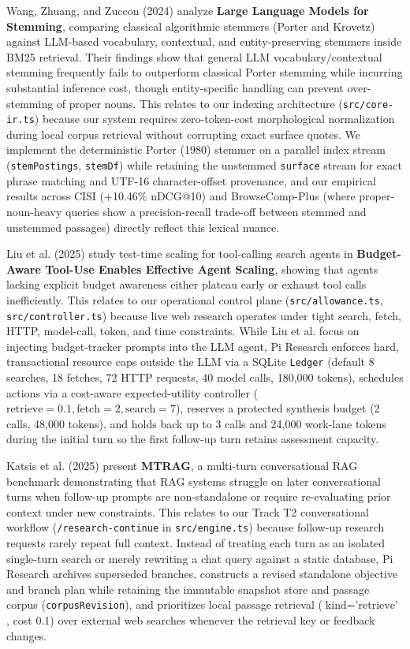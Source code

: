 \documentclass[conference]{IEEEtran}
\begin{document}
Wang, Zhuang, and Zuccon (2024) analyze \textbf{Large Language Models for Stemming}, comparing classical algorithmic stemmers (Porter and Krovetz) against LLM-based vocabulary, contextual, and entity-preserving stemmers inside BM25 retrieval. Their findings show that general LLM vocabulary/contextual stemming frequently fails to outperform classical Porter stemming while incurring substantial inference cost, though entity-specific handling can prevent over-stemming of proper nouns. This relates to our indexing architecture (\texttt{src/core-ir.ts}) because our system requires zero-token-cost morphological normalization during local corpus retrieval without corrupting exact surface quotes. We implement the deterministic Porter (1980) stemmer on a parallel index stream (\texttt{stemPostings}, \texttt{stemDf}) while retaining the unstemmed \texttt{surface} stream for exact phrase matching and UTF-16 character-offset provenance, and our empirical results across CISI (+10.46\% nDCG@10) and BrowseComp-Plus (where proper-noun-heavy queries show a precision-recall trade-off between stemmed and unstemmed passages) directly reflect this lexical nuance.

Liu et al. (2025) study test-time scaling for tool-calling search agents in \textbf{Budget-Aware Tool-Use Enables Effective Agent Scaling}, showing that agents lacking explicit budget awareness either plateau early or exhaust tool calls inefficiently. This relates to our operational control plane (\texttt{src/allowance.ts}, \texttt{src/controller.ts}) because live web research operates under tight search, fetch, HTTP, model-call, token, and time constraints. While Liu et al. focus on injecting budget-tracker prompts into the LLM agent, Pi Research enforces hard, transactional resource caps outside the LLM via a SQLite \texttt{Ledger} (default 8 searches, 18 fetches, 72 HTTP requests, 40 model calls, 180,000 tokens), schedules actions via a cost-aware expected-utility controller ($\text{retrieve} = 0.1, \text{fetch} = 2, \text{search} = 7$), reserves a protected synthesis budget (2 calls, 48,000 tokens), and holds back up to 3 calls and 24,000 work-lane tokens during the initial turn so the first follow-up turn retains assessment capacity.

Katsis et al. (2025) present \textbf{MTRAG}, a multi-turn conversational RAG benchmark demonstrating that RAG systems struggle on later conversational turns when follow-up prompts are non-standalone or require re-evaluating prior context under new constraints. This relates to our Track T2 conversational workflow (\texttt{/research-continue} in \texttt{src/engine.ts}) because follow-up research requests rarely repeat full context. Instead of treating each turn as an isolated single-turn search or merely rewriting a chat query against a static database, Pi Research archives superseded branches, constructs a revised standalone objective and branch plan while retaining the immutable snapshot store and passage corpus (\texttt{corpusRevision}), and prioritizes local passage retrieval ($\text{kind} = \text{'retrieve'}$, cost 0.1) over external web searches whenever the retrieval key or feedback changes.
\end{document}
